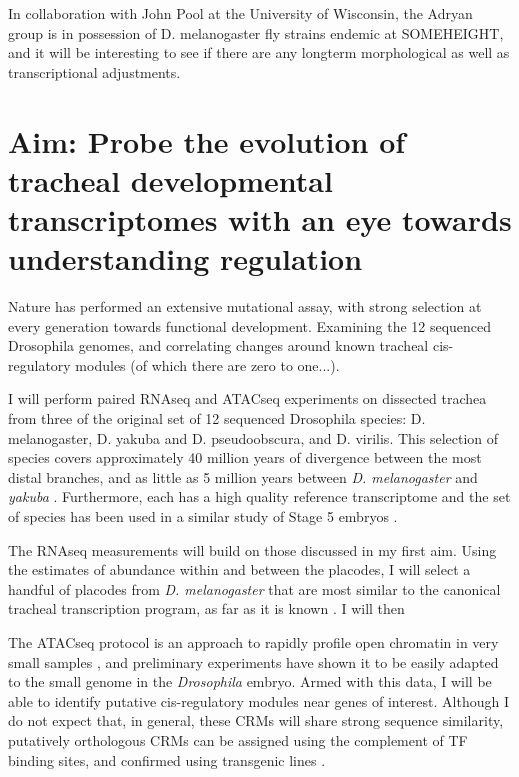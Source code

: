 \documentclass{proposal}
\begin{document}
In collaboration with John Pool at the University of Wisconsin, the Adryan group is in possession of D. melanogaster fly strains endemic at SOMEHEIGHT, and it will be interesting to see if there are any longterm morphological as well as transcriptional adjustments.

\section{Aim: Probe the evolution of tracheal developmental transcriptomes with an eye towards understanding regulation}

Nature has performed an extensive mutational assay, with strong selection at every generation towards functional development.
Examining the 12 sequenced Drosophila genomes, and correlating changes around known tracheal cis-regulatory modules (of which there are zero to one...).

I will perform paired RNAseq and ATACseq experiments on dissected trachea from three of the original set of 12 sequenced Drosophila species: D. melanogaster, D. yakuba and D. pseudoobscura, and D. virilis.
This selection of species covers approximately 40 million years of divergence between the most distal branches, and as little as 5 million years between {\em D. melanogaster} and {\em yakuba} \cite{Russo:1995ti}.
Furthermore, each has a high quality reference transcriptome and the set of species has been used in a similar study of Stage 5 embryos \cite{Paris:2013ib}. 

The RNAseq measurements will build on those discussed in my first aim.  
Using the estimates of abundance within and between the placodes, I will select a handful of placodes from {\em D. melanogaster} that are most similar to the canonical tracheal transcription program, as far as it is known \cite{Ghabrial:2003kz}. 
I will then 

The ATACseq protocol is an approach to rapidly profile open chromatin in very small samples \cite{Buenrostro:2013bc}, and preliminary experiments have shown it to be easily adapted to the small genome in the {\em Drosophila} embryo.
Armed with this data, I will be able to identify putative cis-regulatory modules near genes of interest. 
Although I do not expect that, in general, these CRMs will share strong sequence similarity, putatively orthologous CRMs can be assigned using the complement of TF binding sites, and confirmed using transgenic lines \cite{Hare:2008fi}.
\end{document}

